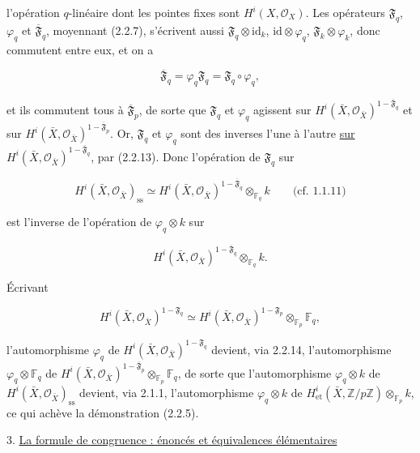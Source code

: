 l'opération $q$-linéaire dont les pointes fixes sont $H^i(X,\mathcal O_X)$.
Les opérateurs $\mathfrak F_q$, $\varphi_q$ et
$\overline{\mathfrak F}_q$, moyennant (2.2.7), s'écrivent aussi
$\mathfrak F_q\otimes\mathrm{id}_k$, $\mathrm{id}\otimes\varphi_q$,
$\mathfrak F_k\otimes\varphi_k$, donc commutent entre eux, et on a

\begin{equation}\tag{2.2.13}
\overline{\mathfrak F}_q
=\varphi_q\mathfrak F_q
=\mathfrak F_q\circ\varphi_q,
\end{equation}

et ils commutent tous à $\overline{\mathfrak F}_p$, de sorte que $\mathfrak F_q$ et
$\varphi_q$ agissent sur
$H^i(\bar X,\mathcal O_{\bar X})^{1-\overline{\mathfrak F}_q}$ et sur
$H^i(\bar X,\mathcal O_{\bar X})^{1-\overline{\mathfrak F}_p}$. Or,
$\mathfrak F_q$ et $\varphi_q$ sont des inverses l'une à l'autre \underline{sur}
$H^i(\bar X,\mathcal O_{\bar X})^{1-\overline{\mathfrak F}_q}$, par (2.2.13).
Donc l'opération de $\mathfrak F_q$ sur

\[
H^i(\bar X,\mathcal O_{\bar X})_{\mathrm{ss}}
\simeq
H^i(\bar X,\mathcal O_{\bar X})^{1-\overline{\mathfrak F}_q}
\otimes_{\mathbb F_q}k
\qquad\text{(cf. 1.1.11)}
\]

est l'inverse de l'opération de $\varphi_q\otimes k$ sur

\[
H^i(\bar X,\mathcal O_{\bar X})^{1-\overline{\mathfrak F}_q}
\otimes_{\mathbb F_q}k.
\]

Écrivant

\begin{equation}\tag{2.2.14}
H^i(\bar X,\mathcal O_{\bar X})^{1-\mathfrak F_q}
\simeq
H^i(\bar X,\mathcal O_{\bar X})^{1-\mathfrak F_p}
\otimes_{\mathbb F_p}\mathbb F_q,
\end{equation}

l'automorphisme $\varphi_q$ de
$H^i(\bar X,\mathcal O_{\bar X})^{1-\mathfrak F_q}$ devient, via
2.2.14, l'automorphisme $\varphi_q\otimes\mathbb F_q$ de
$H^i(\bar X,\mathcal O_{\bar X})^{1-\overline{\mathfrak F}_p}
\otimes_{\mathbb F_p}\mathbb F_q$, de sorte que l'automorphisme
$\varphi_q\otimes k$ de $H^i(\bar X,\mathcal O_{\bar X})_{\mathrm{ss}}$
devient, via 2.1.1, l'automorphisme $\varphi_q\otimes k$ de
$H^i_{\mathrm{et}}(\bar X,\mathbb Z/p\mathbb Z)\otimes_{\mathbb F_p}k$,
ce qui achève la démonstration (2.2.5).


3. \underline{La formule de congruence : énoncés et équivalences élémentaires}


